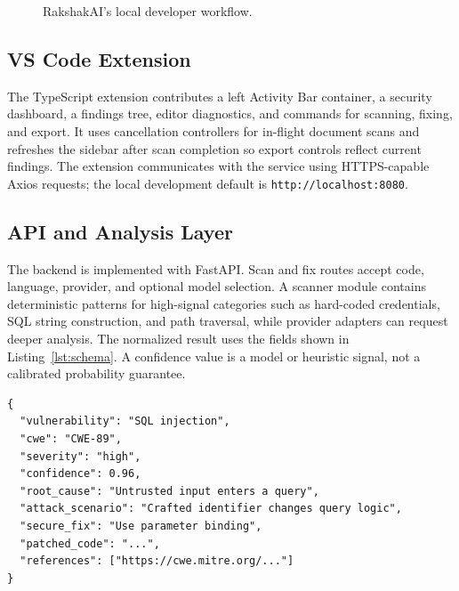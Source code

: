 \documentclass[10pt,conference]{IEEEtran}
\begin{document}
\begin{figure}[t]
\centering
{}
\caption{RakshakAI's local developer workflow.}
\label{fig:flow}
\end{figure}

\subsection{VS Code Extension}
The TypeScript extension contributes a left Activity Bar container, a security dashboard, a findings tree, editor diagnostics, and commands for scanning, fixing, and export. It uses cancellation controllers for in-flight document scans and refreshes the sidebar after scan completion so export controls reflect current findings. The extension communicates with the service using HTTPS-capable Axios requests; the local development default is \texttt{http://localhost:8080}.

\subsection{API and Analysis Layer}
The backend is implemented with FastAPI. Scan and fix routes accept code, language, provider, and optional model selection. A scanner module contains deterministic patterns for high-signal categories such as hard-coded credentials, SQL string construction, and path traversal, while provider adapters can request deeper analysis. The normalized result uses the fields shown in Listing~\ref{lst:schema}. A confidence value is a model or heuristic signal, not a calibrated probability guarantee.

\begin{lstlisting}[caption={Normalized vulnerability finding},label={lst:schema}]
{
  "vulnerability": "SQL injection",
  "cwe": "CWE-89",
  "severity": "high",
  "confidence": 0.96,
  "root_cause": "Untrusted input enters a query",
  "attack_scenario": "Crafted identifier changes query logic",
  "secure_fix": "Use parameter binding",
  "patched_code": "...",
  "references": ["https://cwe.mitre.org/..."]
}
\end{lstlisting}
\end{document}
